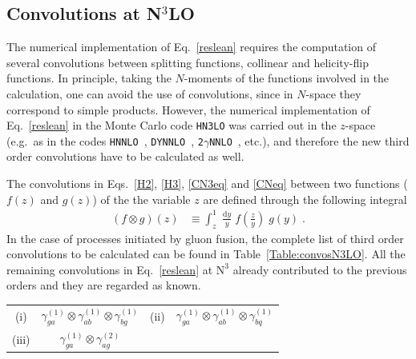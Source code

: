 \documentclass[12pt]{article}
\DeclareRobustCommand{\rd}{\ensuremath{\mathrm{d}}}
\DeclareRobustCommand{\LO}{\text{LO}\xspace}
\DeclareRobustCommand{\N}[1]{\ensuremath{\text{N}^{#1}}} %
\begin{document}
\begin{appendix}
\section{Convolutions at \texorpdfstring{N${}^\text{3}$LO}{N3LO}}
\label{app:Convos}

The numerical implementation of Eq.~\eqref{reslean} requires the computation of several convolutions between splitting functions, collinear and helicity-flip functions. In principle, taking the $N$-moments of the functions involved in the calculation, one can avoid the use of convolutions, since in $N$-space they correspond to simple products. However, the numerical implementation of Eq.~\eqref{reslean} in the Monte Carlo code \texttt{HN3LO} was carried out in the $z$-space (e.g.\ as in the codes \texttt{HNNLO}~\cite{Catani:2007vq}, \texttt{DYNNLO}~\cite{Catani:2009sm}, \texttt{2$\gamma$NNLO}~\cite{Catani:2011qz}, etc.), and therefore the new third order convolutions have to be calculated as well. 

The convolutions in Eqs.~\eqref{H2}, \eqref{H3}, \eqref{CN3eq} and \eqref{CNeq} between two functions ($f(z)$ and $g(z)$) of the the variable $z$ are defined through the following integral
\begin{align}
  \left( f \otimes g \right)(z) &\equiv \int^{1}_{z} \; \frac{\rd y}{y} \; f\left(\frac{z}{y}\right) \; g(y) \;.
\end{align}
In the case of processes initiated by gluon fusion, the complete list of third order convolutions to be calculated can be found in Table~\ref{Table:convosN3LO}. All the remaining convolutions in Eq.~\eqref{reslean} at \N3\LO already  contributed to the previous orders and they are regarded as known.

\begin{table}
\centering
\renewcommand{\arraystretch}{1.5}
\begin{tabular}{ |c|c||c|c| }
\hline
\multirow{1}{*}{(i)} 

& $\gamma^{(1)}_{ga}\otimes\gamma^{(1)}_{a b}\otimes\gamma^{(1)}_{bg}$

& \multirow{1}{*}{(ii)} 

& $\gamma^{(1)}_{ga}\otimes\gamma^{(1)}_{ab}\otimes\gamma^{(1)}_{bq}$  \\


\multirow{1}{*}{(iii)} 

& $\gamma^{(1)}_{ga}\otimes\gamma^{(2)}_{ag}$


\end{tabular}
\end{table}
\end{appendix}
\end{document}
